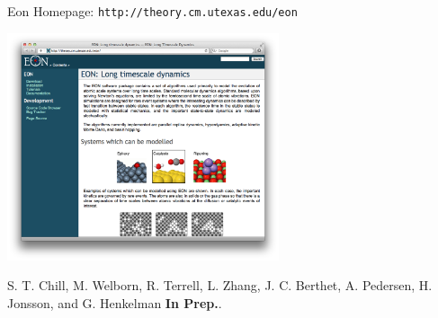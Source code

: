 \documentclass[onlymath]{beamer}
\begin{document}
%
%
%
%
%
%
%	  
%
%
%

\begin{frame}{Eon Homepage: \texttt{http://theory.cm.utexas.edu/eon}}
  \begin{center}
    \includegraphics[width=0.6\textwidth]{images/eon-website.png}
  \end{center}
  {\tiny S. T. Chill,  M. Welborn, R. Terrell, L. Zhang, J. C. Berthet, A. Pedersen, H. Jonsson, and G. Henkelman \textbf{In Prep.}.}
\end{frame}
\end{document}
